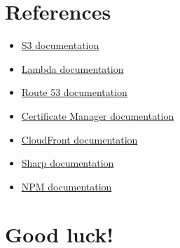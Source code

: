 \documentclass{article}
\begin{document}
\section{References}\label{references}
\begin{itemize}
  \item \href{https://docs.aws.amazon.com/AmazonS3/latest/userguide/Welcome.html}{S3 documentation}
  \item \href{https://docs.aws.amazon.com/lambda/latest/dg/welcome.html}{Lambda documentation}
  \item \href{https://docs.aws.amazon.com/Route53/latest/DeveloperGuide/Welcome.html}{Route 53 documentation}
  \item \href{https://docs.aws.amazon.com/acm/latest/userguide/acm-overview.html}{Certificate Manager documentation}
  \item \href{https://docs.aws.amazon.com/AmazonCloudFront/latest/DeveloperGuide/Introduction.html}{CloudFront documentation}
  \item \href{https://sharp.pixelplumbing.com/}{Sharp documentation}
  \item \href{https://docs.npmjs.com/}{NPM documentation}
\end{itemize}
\section*{Good luck!}
\end{document}
